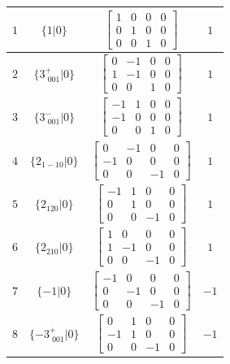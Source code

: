 \documentclass[fleqn,8pt]{jsarticle}
\begin{document}
\begin{longtable}{cccc}
$ 1 $ & $ \{1|0\} $ & $ \begin{bmatrix} 1 & 0 & 0 & 0 \\ 0 & 1 & 0 & 0 \\ 0 & 0 & 1 & 0 \end{bmatrix} $ & $ 1 $ \\ \hline
$ 2 $ & $ \{3^{+}_{\,\,001}|0\} $ & $ \begin{bmatrix} 0 & -1 & 0 & 0 \\ 1 & -1 & 0 & 0 \\ 0 & 0 & 1 & 0 \end{bmatrix} $ & $ 1 $ \\ \hline
$ 3 $ & $ \{3^{-}_{\,\,001}|0\} $ & $ \begin{bmatrix} -1 & 1 & 0 & 0 \\ -1 & 0 & 0 & 0 \\ 0 & 0 & 1 & 0 \end{bmatrix} $ & $ 1 $ \\ \hline
$ 4 $ & $ \{2{}_{1-10}|0\} $ & $ \begin{bmatrix} 0 & -1 & 0 & 0 \\ -1 & 0 & 0 & 0 \\ 0 & 0 & -1 & 0 \end{bmatrix} $ & $ 1 $ \\ \hline
$ 5 $ & $ \{2{}_{120}|0\} $ & $ \begin{bmatrix} -1 & 1 & 0 & 0 \\ 0 & 1 & 0 & 0 \\ 0 & 0 & -1 & 0 \end{bmatrix} $ & $ 1 $ \\ \hline
$ 6 $ & $ \{2{}_{210}|0\} $ & $ \begin{bmatrix} 1 & 0 & 0 & 0 \\ 1 & -1 & 0 & 0 \\ 0 & 0 & -1 & 0 \end{bmatrix} $ & $ 1 $ \\ \hline
$ 7 $ & $ \{-1|0\} $ & $ \begin{bmatrix} -1 & 0 & 0 & 0 \\ 0 & -1 & 0 & 0 \\ 0 & 0 & -1 & 0 \end{bmatrix} $ & $ -1 $ \\ \hline
$ 8 $ & $ \{-3^{+}_{\,\,001}|0\} $ & $ \begin{bmatrix} 0 & 1 & 0 & 0 \\ -1 & 1 & 0 & 0 \\ 0 & 0 & -1 & 0 \end{bmatrix} $ & $ -1 $ \\ \hline

\end{longtable}
\end{document}
